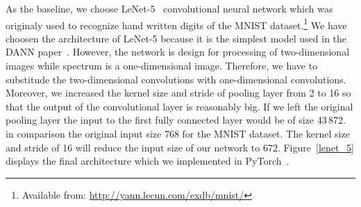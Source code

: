 As the baseline, we choose LeNet-5~\cite{lecun1998} convolutional neural network
which was originaly used to recognize hand written digits
of the MNIST dataset.\footnote{Available from: \url{http://yann.lecun.com/exdb/mnist/}}
We have choosen the architecture of LeNet-5
because it is the simplest model used in the DANN paper~\cite{ganin2016}.
However, the network is design for processing of two-dimensional images
while spectrum is a one-dimensional image.
Therefore, we have to substitude the two-dimensional convolutions with one-dimensional convolutions.
Moreover, we increased the kernel size and stride of pooling layer from 2 to 16
so that the output of the convolutional layer is reasonably big.
If we left the original pooling layer
the input to the first fully connected layer would be of size 43\,872.
in comparison the original input size 768 for the MNIST dataset.
The kernel size and stride of 16 will reduce the input size of our network to 672.
Figure~\ref{lenet_5} displays the final architecture
which we implemented in PyTorch~\cite{paszke2019}.

